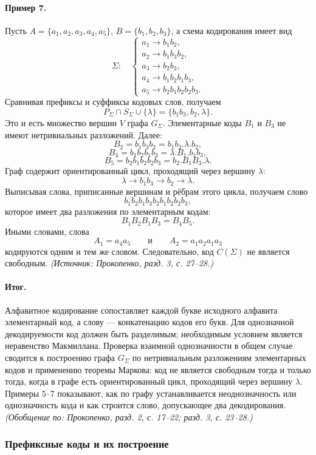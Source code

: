 \documentclass[a4paper,12pt]{article}
\begin{document}
\paragraph{Пример 7.}
Пусть \(A=\{a_1,a_2,a_3,a_4,a_5\}\), \(B=\{b_1,b_2,b_3\}\), а схема кодирования имеет вид
\[
\Sigma:\quad
\begin{cases}
a_1\to b_1b_2,\\
a_2\to b_1b_3b_2,\\
a_3\to b_2b_3,\\
a_4\to b_1b_2b_1b_3,\\
a_5\to b_2b_1b_2b_2b_3.
\end{cases}
\]
Сравнивая префиксы и суффиксы кодовых слов, получаем
\[
P_\Sigma\cap S_\Sigma\cup\{\lambda\}=\{b_1b_3,b_2,\lambda\}.
\]
Это и есть множество вершин \(V\) графа \(G_\Sigma\). Элементарные коды \(B_1\) и \(B_3\) не имеют нетривиальных разложений. Далее:
\[
B_2=b_1b_3b_2=b_1b_3.\lambda.b_2,
\]
\[
B_4=b_1b_2b_1b_3=\lambda.B_1.b_1b_3,
\]
\[
B_5=b_2b_1b_2b_2b_3=b_2.B_1B_3.\lambda.
\]
Граф содержит ориентированный цикл, проходящий через вершину \(\lambda\):
\[
\lambda\to b_1b_3\to b_2\to\lambda.
\]
Выписывая слова, приписанные вершинам и рёбрам этого цикла, получаем слово
\[
b_1b_2b_1b_3b_2b_1b_2b_2b_3,
\]
которое имеет два разложения по элементарным кодам:
\[
B_1B_2B_1B_3=B_4B_5.
\]
Иными словами, слова
\[
A_1=a_4a_5
\qquad\text{и}\qquad
A_2=a_1a_2a_1a_3
\]
кодируются одним и тем же словом. Следовательно, код \(C(\Sigma)\) не является свободным.
\textit{(Источник: Прокопенко, разд. 3, с. 27--28.)}

\paragraph{Итог.}
Алфавитное кодирование сопоставляет каждой букве исходного алфавита элементарный код, а слову — конкатенацию кодов его букв. Для однозначной декодируемости код должен быть разделимым; необходимым условием является неравенство Макмиллана. Проверка взаимной однозначности в общем случае сводится к построению графа \(G_\Sigma\) по нетривиальным разложениям элементарных кодов и применению теоремы Маркова: код не является свободным тогда и только тогда, когда в графе есть ориентированный цикл, проходящий через вершину \(\lambda\). Примеры 5--7 показывают, как по графу устанавливается неоднозначность или однозначность кода и как строится слово, допускающее два декодирования.
\textit{(Обобщение по: Прокопенко, разд. 2, с. 17--22; разд. 3, с. 23--28.)}

\subsubsection{Префиксные коды и их построение}
\end{document}
